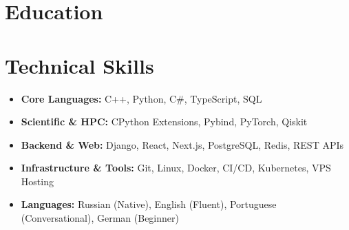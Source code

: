 \documentclass[11pt,a4paper,sans]{moderncv}
\begin{document}
	\section{Education}
	{}{}

	\section{Technical Skills}
	\begin{itemize}
		\item \textbf{Core Languages:} C++, Python, C\#, TypeScript, SQL
		\item \textbf{Scientific \& HPC:} CPython Extensions, Pybind, PyTorch, Qiskit
		\item \textbf{Backend \& Web:} Django, React, Next.js, PostgreSQL, Redis, REST APIs
		\item \textbf{Infrastructure \& Tools:} Git, Linux, Docker, CI/CD, Kubernetes, VPS Hosting
		\item \textbf{Languages:} Russian (Native), English (Fluent), Portuguese (Conversational), German (Beginner)
	\end{itemize}
\end{document}

